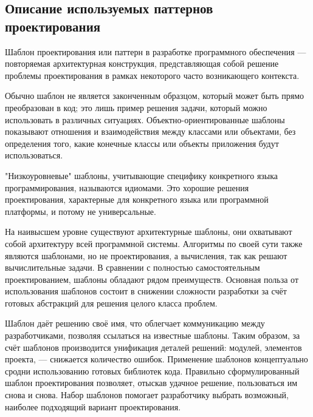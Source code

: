 \subsection{Описание используемых паттернов проектирования}
\label{sec:modeling:patterns}

Шаблон проектирования или паттерн в разработке программного обеспечения — повторяемая архитектурная конструкция, представляющая собой решение проблемы проектирования в рамках некоторого часто возникающего контекста.

Обычно шаблон не является законченным образцом, который может быть прямо преобразован в код; это лишь пример решения задачи, который можно использовать в различных ситуациях. Объектно-ориентированные шаблоны показывают отношения и взаимодействия между классами или объектами, без определения того, какие конечные классы или объекты приложения будут использоваться.

"Низкоуровневые" шаблоны, учитывающие специфику конкретного языка программирования, называются идиомами. Это хорошие решения проектирования, характерные для конкретного языка или программной платформы, и потому не универсальные.

На наивысшем уровне существуют архитектурные шаблоны, они охватывают собой архитектуру всей программной системы. Алгоритмы по своей сути также являются шаблонами, но не проектирования, а вычисления, так как решают вычислительные задачи. В сравнении с полностью самостоятельным проектированием, шаблоны обладают рядом преимуществ. Основная польза от использования шаблонов состоит в снижении сложности разработки за счёт готовых абстракций для решения целого класса проблем. 

Шаблон даёт решению своё имя, что облегчает коммуникацию между разработчиками, позволяя ссылаться на известные шаблоны. Таким образом, за счёт шаблонов производится унификация деталей решений: модулей, элементов проекта, — снижается количество ошибок. Применение шаблонов концептуально сродни использованию готовых библиотек кода. Правильно сформулированный шаблон проектирования позволяет, отыскав удачное решение, пользоваться им снова и снова. Набор шаблонов помогает разработчику выбрать возможный, наиболее подходящий вариант проектирования. 

